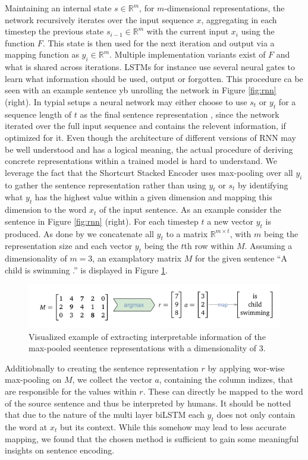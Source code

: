 Maintaining an internal state $s \in \mathbb{R}^m$, for $m$-dimensional representations, the network recursively iterates over the input sequence $x$, aggregating in each timestep the previous state $s_{i-1} \in \mathbb{R}^m$ with the current input $x_i$ using the function $F$. This state is then used for the next iteration and output via a mapping function as $y_i \in \mathbb{R}^m$. Multiple implementation variants exist of $F$ and what is shared across iterations. \ac{LSTM}s for instance use several neural gates to learn what information should be used, output or forgotten. This procedure ca be seen with an example sentence yb unrolling the network in Figure \ref{fig:rnn} (right). In typial setups a neural network may either choose to use $s_t$ or $y_t$ for a sequence length of $t$ as the final sentence representation \citep{goldberg2017Apr}, since the network iterated over the full input sequence and contains the relevent information, if optimized for it. Even though the architecture of different versions of \ac{RNN} may be well understood and has a logical meaning, the actual procedure of deriving concrete representations within a trained model is hard to understand. We leverage the fact that the Shortcurt Stacked Encoder uses max-pooling over all $y_i$ to gather the sentence representation rather than using $y_t$ or $s_t$ by identifying what $y_t$ has the highest value within a given dimension and mapping this dimension to the word $x_t$ of the input sentence. As an example consider the sentence in Figure \ref{fig:rnn} (right). For each timestep $t$ a new vector $y_t$ is produced. As done by \cite{nie2017shortcut} we concatenate all $y_t$ to a matrix $\mathbb{R}^{m \times t}$, with $m$ being the representation size and each vector $y_t$ being the $t$th row within $M$. Assuming a dimensionality of $m = 3$, an examplatory matrix $M$ for the given sentence ``A child is swimming .'' is displayed in Figure \ref{fig:example_process_understanding}. 
\begin{figure}[tph!]
\centering
	\includegraphics[totalheight=2cm]{fig/example_process_understanding.png}
	\caption{Visualized example of extracting interpretable information of the max-pooled seentence representations with a dimensionality of 3.}
	\label{fig:example_process_understanding}
\end{figure}
Additiobnally to creating the sentence representation $r$ by applying wor-wise max-pooling on $M$, we collect the vector $a$, containing the column indizes, that are responsible for the values within $r$. These can directly be mapped to the word of the source sentence and thus be interpreted by humans. It should be notted that due to the nature of the multi layer \ac{biLSTM} each $y_t$ does not only contain the word at $x_t$ but its context. While this somehow may lead to less accurate mapping, we found that the chosen method is sufficient to gain some meaningful insights on sentence encoding.

